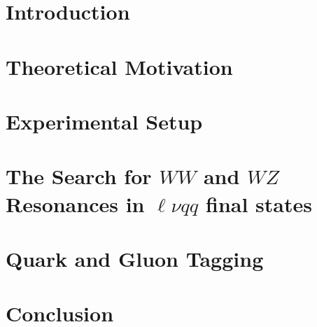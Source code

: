 \part{Introduction}


\part{Theoretical Motivation}


\part {Experimental Setup}

%

\part{The Search for $WW$ and $WZ$ Resonances in $\ell\nu qq$ final states}



\part{Quark and Gluon Tagging}


\part{Conclusion}



\nocite{*}

\singlespacing

\doublespacing


